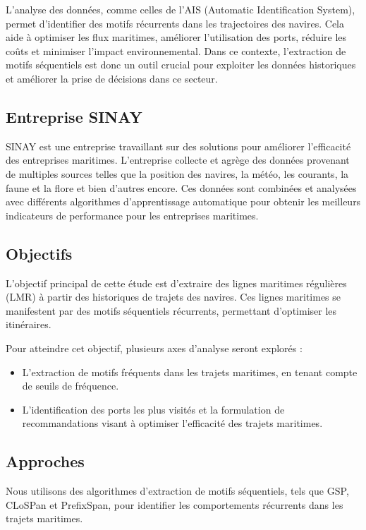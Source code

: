\documentclass[a4paper,12pt]{article}
\begin{document}
L’analyse des données, comme celles de l’AIS  (Automatic Identification System), permet d’identifier des motifs récurrents dans les trajectoires des navires. Cela aide à optimiser les flux maritimes, améliorer l’utilisation des ports, réduire les coûts et minimiser l'impact environnemental. Dans ce contexte, l’extraction de motifs séquentiels est donc un outil crucial pour exploiter les données historiques et améliorer la prise de décisions dans ce secteur.

\subsection{Entreprise SINAY}
SINAY est une entreprise travaillant sur des solutions pour améliorer l’efficacité des entreprises maritimes. L’entreprise collecte et agrège des données provenant de multiples sources telles que la position des navires, la météo, les courants, la faune et la flore et bien d’autres encore. Ces données sont combinées et analysées avec différents algorithmes d’apprentissage automatique pour obtenir les meilleurs indicateurs de performance pour les entreprises maritimes.

\subsection{Objectifs}
L'objectif principal de cette étude est d'extraire des lignes maritimes régulières (LMR) à partir des historiques de trajets des navires. Ces lignes maritimes se manifestent par des motifs séquentiels récurrents, permettant d'optimiser les itinéraires.

Pour atteindre cet objectif, plusieurs axes d'analyse seront explorés : \begin{itemize} \item L'extraction de motifs fréquents dans les trajets maritimes, en tenant compte de seuils de fréquence. \item L'identification des ports les plus visités et la formulation de recommandations visant à optimiser l'efficacité des trajets maritimes.  \end{itemize}

\subsection{Approches}
Nous utilisons des algorithmes d'extraction de motifs séquentiels, tels que GSP, CLoSPan et  PrefixSpan, pour identifier les comportements récurrents dans les trajets maritimes. 
\newpage
\end{document}
